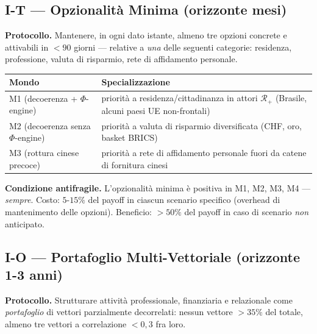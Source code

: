\subsection{I-T --- Opzionalità Minima (orizzonte
mesi)}\label{i-t-opzionalituxe0-minima-orizzonte-mesi}

\Hypoth{} \textbf{Protocollo.} Mantenere, in ogni dato istante, almeno
tre opzioni concrete e attivabili in \(< 90\) giorni --- relative a
\emph{una} delle seguenti categorie: residenza, professione, valuta di
risparmio, rete di affidamento personale.

{\def\LTcaptype{none} %
{\small\begin{longtable}[]{@{}
  >{\raggedright\arraybackslash}p{}
  >{\raggedright\arraybackslash}p{}@{}}
\toprule\noalign{}
\begin{minipage}[b]{\linewidth}\raggedright
Mondo
\end{minipage} & \begin{minipage}[b]{\linewidth}\raggedright
Specializzazione
\end{minipage} \\
\midrule\noalign{}
\endhead
\bottomrule\noalign{}
\endlastfoot
M1 (decoerenza + $\Phi$-engine) & priorità a residenza/cittadinanza in attori
\(\mathcal{R}_+\) (Brasile, alcuni paesi UE non-frontali) \\
M2 (decoerenza senza $\Phi$-engine) & priorità a valuta di risparmio
diversificata (CHF, oro, basket BRICS) \\
M3 (rottura cinese precoce) & priorità a rete di affidamento personale
fuori da catene di fornitura cinesi \\
\end{longtable}}
}

\Proved{} \textbf{Condizione antifragile.} L'opzionalità minima è
positiva in M1, M2, M3, M4 --- \emph{sempre}. Costo: \(5\)-\(15\%\) del
payoff in ciascun scenario specifico (overhead di mantenimento delle
opzioni). Beneficio: \(> 50\%\) del payoff in caso di scenario
\emph{non} anticipato.

\subsection{I-O --- Portafoglio Multi-Vettoriale (orizzonte 1-3
anni)}\label{i-o-portafoglio-multi-vettoriale-orizzonte-1-3-anni}

\Hypoth{} \textbf{Protocollo.} Strutturare attività professionale,
finanziaria e relazionale come \emph{portafoglio} di vettori
parzialmente decorrelati: nessun vettore \(> 35\%\) del totale, almeno
tre vettori a correlazione \(< 0{,}3\) fra loro.

